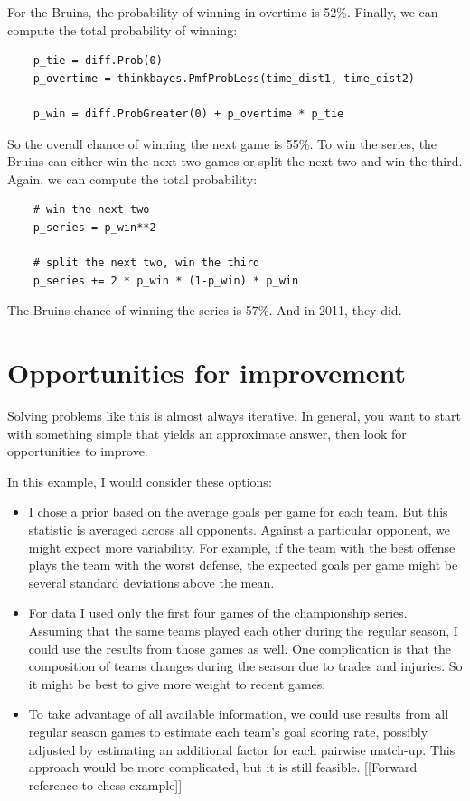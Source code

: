 \documentclass[12pt]{book}
\begin{document}
For the Bruins, the probability of winning in overtime is 52\%.
Finally, we can compute the total probability of winning:

\begin{verbatim}
    p_tie = diff.Prob(0)
    p_overtime = thinkbayes.PmfProbLess(time_dist1, time_dist2)

    p_win = diff.ProbGreater(0) + p_overtime * p_tie
\end{verbatim}  

So the overall chance of winning the next game is 55\%.
To win the series, the Bruins can either win the next two games
or split the next two and win the third.  Again, we can compute
the total probability:

\begin{verbatim}
    # win the next two
    p_series = p_win**2

    # split the next two, win the third
    p_series += 2 * p_win * (1-p_win) * p_win
\end{verbatim}  

The Bruins chance of winning the series is 57\%.  And in 2011,
they did.


\section{Opportunities for improvement}

Solving problems like this is almost always iterative.  In general,
you want to start with something simple that yields an approximate
answer, then look for opportunities to improve.

In this example, I would consider these options:

\begin{itemize}

\item I chose a prior based on the average goals per game for each
  team.  But this statistic is averaged across all opponents.  Against
  a particular opponent, we might expect more variability.  For
  example, if the team with the best offense plays the team with the
  worst defense, the expected goals per game might be several standard
  deviations above the mean.

\item For data I used only the first four games of the championship
  series.  Assuming that the same teams played each other during the
  regular season, I could use the results from those games as well.
  One complication is that the composition of teams changes during
  the season due to trades and injuries.  So it might be best to
  give more weight to recent games.

\item To take advantage of all available information, we could
  use results from all regular season games to estimate each team's
  goal scoring rate, possibly adjusted by estimating
  an additional factor for each pairwise match-up.  This approach
  would be more complicated, but it is still feasible.
  [[Forward reference to chess example]]

\end{itemize}
\end{document}
